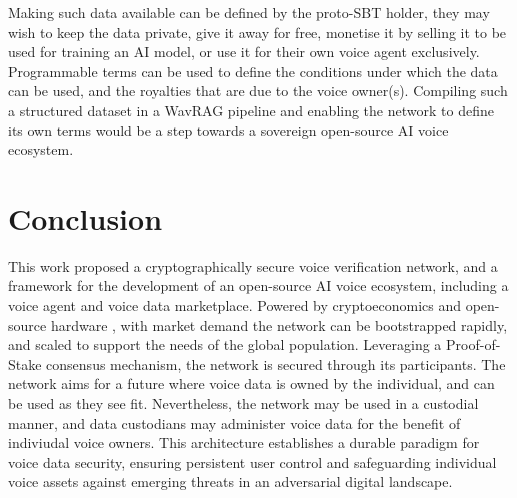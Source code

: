 \documentclass[11pt,a4paper]{article}
\begin{document}
Making such data available can be defined by the proto-SBT holder, they may wish to keep the data private, give it away for free, monetise it by selling it to be used for training an AI model, or use it for their own voice agent exclusively.
Programmable terms can be used to define the conditions under which the data can be used, and the royalties that are due to the voice owner(s).
Compiling such a structured dataset in a WavRAG pipeline and enabling the network to define its own terms would be a step towards a sovereign open-source AI voice ecosystem.

\section{Conclusion}
\label{sec:conclusion}
This work proposed a cryptographically secure voice verification network, and a framework for the development of an open-source AI voice ecosystem, including a voice agent and voice data marketplace.
Powered by cryptoeconomics and open-source hardware \cite{originstory2024}, with market demand the network can be bootstrapped rapidly, and scaled to support the needs of the global population.
Leveraging a Proof-of-Stake consensus mechanism, the network is secured through its participants.
The network aims for a future where voice data is owned by the individual, and can be used as they see fit.
Nevertheless, the network may be used in a custodial manner, and data custodians may administer voice data for the benefit of indiviudal voice owners.
This architecture establishes a durable paradigm for voice data security, ensuring persistent user control and safeguarding individual voice assets against emerging threats in an adversarial digital landscape.


\end{document}
